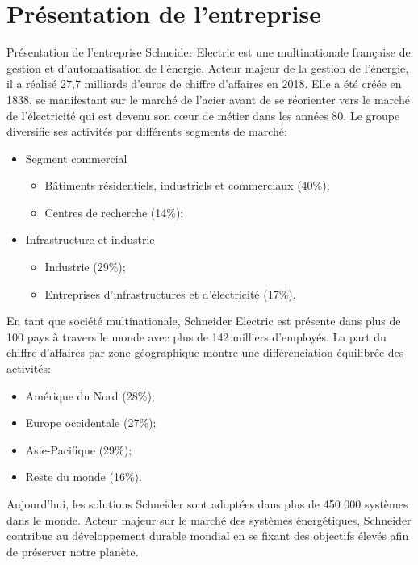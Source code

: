 \documentclass[11pt,]{article}
\providecommand{\tightlist}{%
  \setlength{\itemsep}{0pt}\setlength{\parskip}{0pt}}
\begin{document}
\hypertarget{presentation-de-lentreprise}{%
\section{Présentation de
l'entreprise}\label{presentation-de-lentreprise}}

Présentation de l'entreprise Schneider Electric est une multinationale
française de gestion et d'automatisation de l'énergie. Acteur majeur de
la gestion de l'énergie, il a réalisé 27,7 milliards d'euros de chiffre
d'affaires en 2018. Elle a été créée en 1838, se manifestant sur le
marché de l'acier avant de se réorienter vers le marché de l'électricité
qui est devenu son cœur de métier dans les années 80. Le groupe
diversifie ses activités par différents segments de marché:

\begin{itemize}
\tightlist
\item
  Segment commercial

  \begin{itemize}
  \tightlist
  \item
    Bâtiments résidentiels, industriels et commerciaux (40\%);
  \item
    Centres de recherche (14\%);
  \end{itemize}
\item
  Infrastructure et industrie

  \begin{itemize}
  \tightlist
  \item
    Industrie (29\%);
  \item
    Entreprises d'infrastructures et d'électricité (17\%).
  \end{itemize}
\end{itemize}

En tant que société multinationale, Schneider Electric est présente dans
plus de 100 pays à travers le monde avec plus de 142 milliers
d'employés. La part du chiffre d'affaires par zone géographique montre
une différenciation équilibrée des activités:

\begin{itemize}
\tightlist
\item
  Amérique du Nord (28\%);
\item
  Europe occidentale (27\%);
\item
  Asie-Pacifique (29\%);
\item
  Reste du monde (16\%).
\end{itemize}

Aujourd'hui, les solutions Schneider sont adoptées dans plus de 450 000
systèmes dans le monde. Acteur majeur sur le marché des systèmes
énergétiques, Schneider contribue au développement durable mondial en se
fixant des objectifs élevés afin de préserver notre planète.
\end{document}

